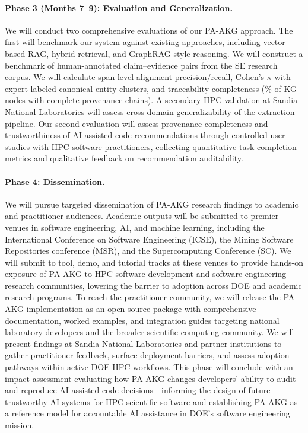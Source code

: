 \documentclass{files/proposalnsf}
\begin{document}
\paragraph{Phase 3 (Months 7--9): Evaluation and Generalization.}
We will conduct two comprehensive evaluations of our PA-AKG approach. The first will benchmark our system against existing approaches, including vector-based RAG, hybrid retrieval, and GraphRAG-style reasoning. We will construct a benchmark of human-annotated claim--evidence pairs from the SE research corpus. We will calculate span-level alignment precision/recall, Cohen's $\kappa$ with expert-labeled canonical entity clusters, and traceability completeness (\ie \% of KG nodes with complete provenance chains). A secondary HPC validation at Sandia National Laboratories will assess cross-domain generalizability of the extraction pipeline. Our second evaluation will assess provenance completeness and trustworthiness of AI-assisted code recommendations through controlled user studies with HPC software practitioners, collecting quantitative task-completion metrics and qualitative feedback on recommendation auditability.

\paragraph{Phase 4: Dissemination.}
We will pursue targeted dissemination of PA-AKG research findings to academic and practitioner audiences. Academic outputs will be submitted to premier venues in software engineering, AI, and machine learning, including the International Conference on Software Engineering (ICSE), the Mining Software Repositories conference (MSR), and the Supercomputing Conference (SC). We will submit to tool, demo, and tutorial tracks at these venues to provide hands-on exposure of PA-AKG to HPC software development and software engineering research communities, lowering the barrier to adoption across DOE and academic research programs. To reach the practitioner community, we will release the PA-AKG implementation as an open-source package with comprehensive documentation, worked examples, and integration guides targeting national laboratory developers and the broader scientific computing community. We will present findings at Sandia National Laboratories and partner institutions to gather practitioner feedback, surface deployment barriers, and assess adoption pathways within active DOE HPC workflows. This phase will conclude with an impact assessment evaluating how PA-AKG changes developers' ability to audit and reproduce AI-assisted code decisions---informing the design of future trustworthy AI systems for HPC scientific software and establishing PA-AKG as a reference model for accountable AI assistance in DOE's software engineering mission.
\end{document}

